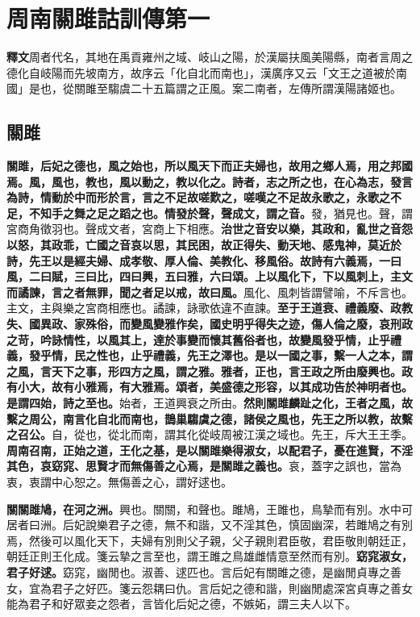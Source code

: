 \chapter{周南關雎詁訓傳第一}

\begin{quoting}\textbf{釋文}周者代名，其地在禹貢雍州之域、岐山之陽，於漢屬扶風美陽縣，南者言周之德化自岐陽而先坡南方，故序云「化自北而南也」，漢廣序又云「文王之道被於南國」是也，從關雎至騶虞二十五篇謂之正風。案二南者，左傳所謂漢陽諸姬也。\end{quoting}

\section{關雎}


\textbf{關雎，后妃之德也，風之始也，所以風天下而正夫婦也，故用之鄉人焉，用之邦國焉。風，風也，教也，風以動之，教以化之。詩者，志之所之也，在心為志，發言為詩，情動於中而形於言，言之不足故嗟歎之，嗟嘆之不足故永歌之，永歌之不足，不知手之舞之足之蹈之也。情發於聲，聲成文，謂之音。}{\footnotesize 發，猶見也。聲，謂宮商角徵羽也。聲成文者，宮商上下相應。}\textbf{治世之音安以樂，其政和，亂世之音怨以怒，其政乖，亡國之音哀以思，其民困，故正得失、動天地、感鬼神，莫近於詩，先王以是經夫婦、成孝敬、厚人倫、美教化、移風俗。故詩有六義焉，一曰風，二曰賦，三曰比，四曰興，五曰雅，六曰頌。上以風化下，下以風刺上，主文而譎諫，言之者無罪，聞之者足以戒，故曰風。}{\footnotesize 風化、風刺皆謂譬喻，不斥言也。主文，主與樂之宮商相應也。譎諫，詠歌依違不直諫。}\textbf{至于王道衰、禮義廢、政教失、國異政、家殊俗，而變風變雅作矣，國史明乎得失之迹，傷人倫之廢，哀刑政之苛，吟詠情性，以風其上，達於事變而懷其舊俗者也，故變風發乎情，止乎禮義，發乎情，民之性也，止乎禮義，先王之澤也。是以一國之事，繫一人之本，謂之風，言天下之事，形四方之風，謂之雅。雅者，正也，言王政之所由廢興也。政有小大，故有小雅焉，有大雅焉。頌者，美盛德之形容，以其成功告於神明者也。是謂四始，詩之至也。}{\footnotesize 始者，王道興衰之所由。}\textbf{然則關雎麟趾之化，王者之風，故繫之周公，南言化自北而南也，鵲巢騶虞之德，諸侯之風也，先王之所以教，故繫之召公。}{\footnotesize 自，從也，從北而南，謂其化從岐周被江漢之域也。先王，斥大王王季。}\textbf{周南召南，正始之道，王化之基，是以關雎樂得淑女，以配君子，憂在進賢，不淫其色，哀窈窕、思賢才而無傷善之心焉，是關雎之義也。}{\footnotesize 哀，蓋字之誤也，當為衷，衷謂中心恕之。無傷善之心，謂好逑也。}

\textbf{關關雎鳩，在河之洲。}{\footnotesize 興也。關關，和聲也。雎鳩，王雎也，鳥摯而有別。水中可居者曰洲。后妃說樂君子之德，無不和諧，又不淫其色，慎固幽深，若雎鳩之有別焉，然後可以風化天下，夫婦有別則父子親，父子親則君臣敬，君臣敬則朝廷正，朝廷正則王化成。箋云摯之言至也，謂王雎之鳥雄雌情意至然而有別。}\textbf{窈窕淑女，君子好逑。}{\footnotesize 窈窕，幽閒也。淑善、逑匹也。言后妃有關雎之德，是幽閒貞專之善女，宜為君子之好匹。箋云怨耦曰仇。言后妃之德和諧，則幽閒處深宮貞專之善女能為君子和好眾妾之怨者，言皆化后妃之德，不嫉妬，謂三夫人以下。}

